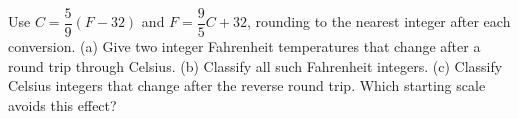 Use $C=\dfrac{5}{9}(F-32)$ and $F=\dfrac{9}{5}C+32$, rounding to the nearest integer after each conversion. (a) Give two integer Fahrenheit temperatures that change after a round trip through Celsius. (b) Classify all such Fahrenheit integers. (c) Classify Celsius integers that change after the reverse round trip. Which starting scale avoids this effect?
